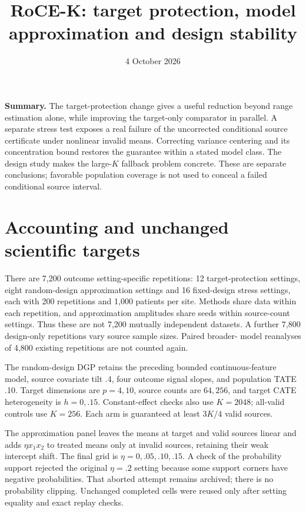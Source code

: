 \documentclass[11pt]{article}
\title{RoCE-K: target protection, model approximation and design stability}
\author{}\date{4 October 2026}
\begin{document}
\maketitle

\textbf{Summary.} The target-protection change gives a useful reduction beyond
range estimation alone, while improving the target-only comparator in parallel.
A separate stress test exposes a real failure of the uncorrected conditional
source certificate under nonlinear invalid means. Correcting variance centering
and its concentration bound restores the guarantee within a stated model class.
The design study makes the large-$K$ fallback problem concrete. These are
separate conclusions; favorable population coverage is not used to conceal a
failed conditional source interval.

\section{Accounting and unchanged scientific targets}

There are 7,200 outcome setting-specific repetitions: 12 target-protection
settings, eight random-design approximation settings and 16 fixed-design stress
settings, each with 200 repetitions and 1,000 patients per site. Methods share
data within each repetition, and approximation amplitudes share seeds within
source-count settings. Thus these are not 7,200 mutually independent datasets.
A further 7,800 design-only repetitions vary source sample sizes. Paired broader-
model reanalyses of 4,800 existing repetitions are not counted again.

The random-design DGP retains the preceding bounded continuous-feature model,
source covariate tilt .4, four outcome signal slopes, and population TATE .10.
Target dimensions are $p=4,10$, source counts are $64,256$, and target CATE
heterogeneity is $h=0,.15$. Constant-effect checks also use $K=2048$; all-valid
controls use $K=256$. Each arm is guaranteed at least $3K/4$ valid sources.

The approximation panel leaves the means at target and valid sources linear and adds
$\eta x_1x_2$ to treated means only at invalid sources, retaining their weak
intercept shift. The final grid is $\eta=0,.05,.10,.15$. A check of the probability support
rejected the original $\eta=.2$ setting because some support corners
have negative probabilities. That aborted attempt remains archived; there is
no probability clipping. Unchanged completed cells were reused only after
setting equality and exact replay checks.
\end{document}
